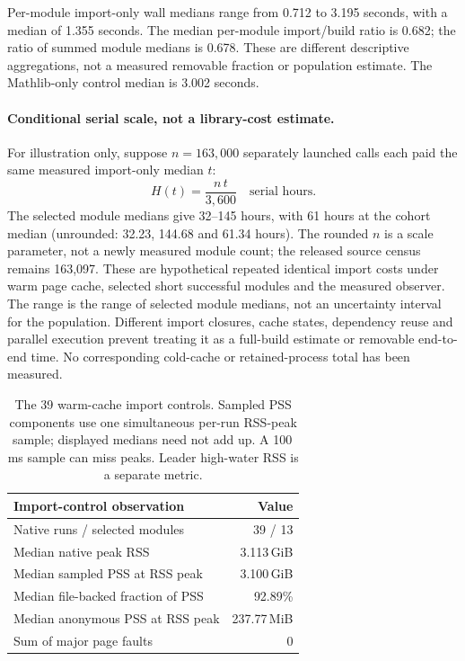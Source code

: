 \documentclass[10pt,twocolumn]{article}
\begin{document}
Per-module import-only wall medians range from 0.712 to 3.195 seconds,
with a median of 1.355 seconds. The median per-module import/build ratio
is 0.682; the ratio of summed module medians is 0.678.
These are different descriptive aggregations, not a measured removable
fraction or population estimate. The Mathlib-only control median is
3.002 seconds.

\paragraph{Conditional serial scale, not a library-cost estimate.}
For illustration only, suppose $n=163{,}000$ separately launched calls
each paid the same measured import-only median $t$:
\[
  H(t)=\frac{n\,t}{3{,}600}\quad\text{serial hours}.
\]
The selected module medians give 32--145 hours, with 61 hours at the
cohort median (unrounded: 32.23, 144.68 and 61.34 hours).
The rounded $n$ is a scale parameter, not a newly measured module count;
the released source census remains 163,097.
These are hypothetical repeated identical import costs under warm page
cache, selected short successful modules and the measured observer.
The range is the range of selected module medians, not an uncertainty
interval for the population.
Different import closures, cache states, dependency reuse and parallel
execution prevent treating it as a full-build estimate or removable
end-to-end time. No corresponding cold-cache or retained-process total
has been measured.

\begin{table}[t]
\centering\small
\begin{tabular}{@{}lr@{}}
\toprule
Import-control observation & Value\\
\midrule
Native runs / selected modules &39 / 13\\
Median native peak RSS &3.113\,GiB\\
Median sampled PSS at RSS peak &3.100\,GiB\\
Median file-backed fraction of PSS &92.89\%\\
Median anonymous PSS at RSS peak &237.77\,MiB\\
Sum of major page faults &0\\
\bottomrule
\end{tabular}
\caption{The 39 warm-cache import controls. Sampled PSS components use one
simultaneous per-run RSS-peak sample; displayed medians need not add up.
A 100\,ms sample can miss peaks. Leader high-water RSS is a separate metric.}
\label{tab:import-memory}
\end{table}
\end{document}
